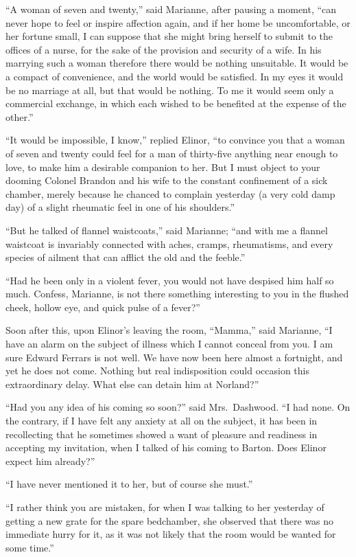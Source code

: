 \documentclass{article}
\begin{document}
``A woman of seven and twenty,'' said Marianne,
after pausing a moment, ``can never hope to feel or inspire
affection again, and if her home be uncomfortable,
or her fortune small, I can suppose that she might
bring herself to submit to the offices of a nurse,
for the sake of the provision and security of a wife.
In his marrying such a woman therefore there would be
nothing unsuitable.  It would be a compact of convenience,
and the world would be satisfied.  In my eyes it would
be no marriage at all, but that would be nothing.
To me it would seem only a commercial exchange, in which
each wished to be benefited at the expense of the other.''

``It would be impossible, I know,'' replied Elinor,
``to convince you that a woman of seven and twenty could
feel for a man of thirty-five anything near enough
to love, to make him a desirable companion to her.
But I must object to your dooming Colonel Brandon and
his wife to the constant confinement of a sick chamber,
merely because he chanced to complain yesterday (a
very cold damp day) of a slight rheumatic feel in one
of his shoulders.''

``But he talked of flannel waistcoats,'' said Marianne;
``and with me a flannel waistcoat is invariably connected
with aches, cramps, rheumatisms, and every species of
ailment that can afflict the old and the feeble.''

``Had he been only in a violent fever, you would not
have despised him half so much.  Confess, Marianne, is not
there something interesting to you in the flushed cheek,
hollow eye, and quick pulse of a fever?''

Soon after this, upon Elinor's leaving the room,
``Mamma,'' said Marianne, ``I have an alarm on the subject
of illness which I cannot conceal from you.  I am sure
Edward Ferrars is not well.  We have now been here almost
a fortnight, and yet he does not come.  Nothing but real
indisposition could occasion this extraordinary delay.
What else can detain him at Norland?''

``Had you any idea of his coming so soon?''
said Mrs.\ Dashwood.  ``I had none.  On the contrary,
if I have felt any anxiety at all on the subject, it has
been in recollecting that he sometimes showed a want
of pleasure and readiness in accepting my invitation,
when I talked of his coming to Barton.  Does Elinor
expect him already?''

``I have never mentioned it to her, but of course
she must.''

``I rather think you are mistaken, for when I
was talking to her yesterday of getting a new grate
for the spare bedchamber, she observed that there
was no immediate hurry for it, as it was not likely
that the room would be wanted for some time.''
\end{document}
